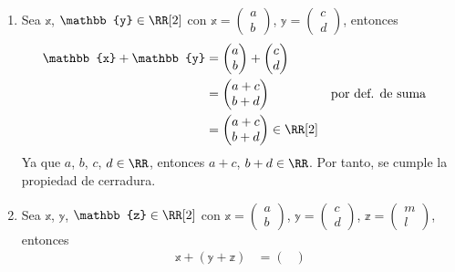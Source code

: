 \begin{examplebox}{}{}
\begin{enumerate}[label=\roman*), topsep=6pt, itemsep=0pt]
        \item Sea $\mathbb{x}$, $\mathbb{y} \in \RR[2]$ con $\mathbb{x} = \begin{pmatrix}
            a \\
            b
        \end{pmatrix}$, $\displaystyle \mathbb{y} = \begin{pmatrix}
            c \\
            d
        \end{pmatrix}$, entonces
        \begin{align*}
            \mathbb{x} + \mathbb{y} & = \begin{pmatrix}
                a \\
                b
            \end{pmatrix} + \begin{pmatrix}
                c \\
                d
            \end{pmatrix} \\
            & = \begin{pmatrix}
                a + c \\
                b + d
            \end{pmatrix} && \text{por def. de suma} \\
            & = \begin{pmatrix}
                a + c \\
                b + d
            \end{pmatrix} \in \RR[2]
        \end{align*}
        Ya que $a$, $b$, $c$, $d \in \RR$, entonces $a+c$, $b+d \in \RR$. Por tanto, se cumple la propiedad de cerradura.
        \item Sea $\mathbb{x}$, $\mathbb{y}$, $\mathbb{z} \in \RR[2]$ con $\mathbb{x} = \begin{pmatrix}
            a \\
            b
        \end{pmatrix}$, $\mathbb{y} = \begin{pmatrix}
            c \\
            d
        \end{pmatrix}$, $\mathbb{z} = \begin{pmatrix}
            m \\
            l
        \end{pmatrix}$, entonces
        \begin{align*}
            \mathbb{x} + (\mathbb{y} + \mathbb{z}) & = \begin{pmatrix}

\end{pmatrix}
\end{align*}
\end{enumerate}
\end{examplebox}
